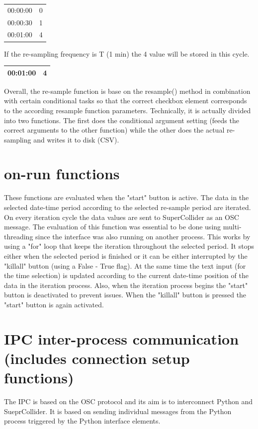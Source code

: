 \documentclass[11pt]{article}
\begin{document}
\begin{center}
\begin{tabular}{rr}
\hline
00:00:00 & 0\\
00:00:30 & 1\\
00:01:00 & 4\\
\hline
\end{tabular}
\end{center}

If the re-sampling frequency is T (1 min) the 4 value will be stored in this cycle.

\begin{center}
\begin{tabular}{rr}
\hline
00:01:00 & 4\\
\hline
\end{tabular}
\end{center}

Overall, the re-sample function is base on the resample() method in combination with certain conditional tasks so that the correct checkbox element corresponds to the according resample function parameters.  Technically, it is actually divided into two functions.  The first does the conditional argument setting (feeds the correct arguments to the other function) while the other does the actual re-sampling and writes it to disk (CSV).

\section{on-run functions}
\label{sec:org8b69098}
These functions are evaluated when the "start" button is active.  The data in the selected date-time period according to the selected re-sample period are iterated.  On every iteration cycle the data values are sent to SuperCollider as an OSC message.  The evaluation of this function was essential to be done using multi-threading since the interface was also running on another process.  This works by using a "for" loop that keeps the iteration throughout the selected period.  It stops either when the selected period is finished or it can be either interrupted by the "killall" button (using a False - True flag).  At the same time the text input (for the time selection) is updated according to the current date-time position of the data in the iteration process.  Also, when the iteration process begins the "start" button is deactivated to prevent issues.  When the "killall" button is pressed the "start" button is again activated.
\section{IPC inter-process communication (includes connection setup functions)}
\label{sec:org982e677}
The IPC is based on the OSC protocol and its aim is to interconnect Python and SueprCollider.  It is based on sending individual messages from the Python process triggered by the Python interface elements.
\end{document}
